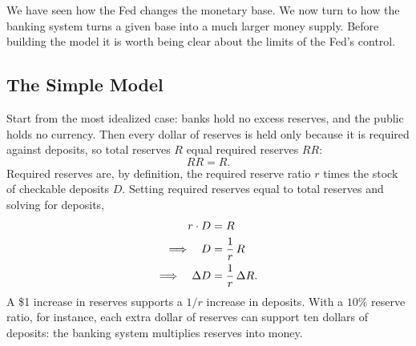 We have seen how the Fed changes the monetary base. We now turn to how the banking system turns a given base into a much larger money supply. Before building the model it is worth being clear about the limits of the Fed's control.



\subsection{The Simple Model}

Start from the most idealized case: banks hold no excess reserves, and the public holds no currency. Then every dollar of reserves is held only because it is required against deposits, so total reserves $R$ equal required reserves $RR$:
\[
RR = R.
\]
Required reserves are, by definition, the required reserve ratio $r$ times the stock of checkable deposits $D$. Setting required reserves equal to total reserves and solving for deposits,
\[
\begin{aligned}
r \cdot D &= R \\
\Longrightarrow\quad D &= \frac{1}{r}\, R \\
\Longrightarrow\quad \Delta D &= \frac{1}{r}\, \Delta R.
\end{aligned}
\]
A \$1 increase in reserves supports a $1/r$ increase in deposits. With a $10\%$ reserve ratio, for instance, each extra dollar of reserves can support ten dollars of deposits: the banking system multiplies reserves into money.

